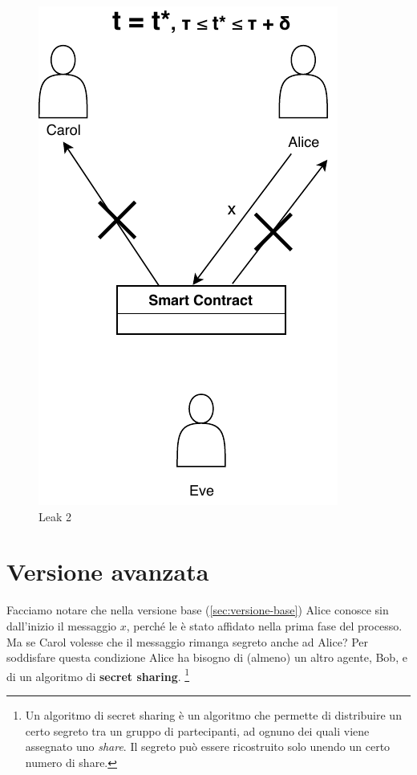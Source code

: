 \begin{figure}[H]
\begin{minipage}{0.4\textwidth}
		\includegraphics[width=.7\linewidth]{images/chap_protocollo/base-leak-2.pdf}
		\caption{Leak 2}
	\end{minipage}
\end{figure}

\section{Versione avanzata}
Facciamo notare che nella versione base (\ref{sec:versione-base})
Alice conosce sin
dall'inizio il messaggio
$ x $, perché le è stato affidato nella prima fase del processo.
Ma se Carol volesse che il messaggio rimanga segreto anche ad Alice?
Per soddisfare questa condizione Alice ha bisogno di (almeno) un altro agente,
Bob, e di un
algoritmo di \textbf{secret sharing}. \footnote{Un algoritmo di secret sharing
	è un algoritmo che permette di
	distribuire un certo segreto tra un gruppo di partecipanti, ad ognuno dei quali viene
	assegnato uno \textit{share}. Il segreto può essere ricostruito solo unendo un certo
	numero di share.}

